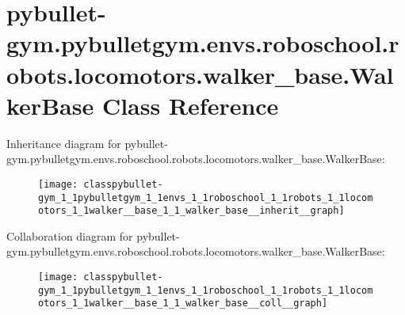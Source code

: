 \hypertarget{classpybullet-gym_1_1pybulletgym_1_1envs_1_1roboschool_1_1robots_1_1locomotors_1_1walker__base_1_1_walker_base}{}\section{pybullet-\/gym.pybulletgym.\+envs.\+roboschool.\+robots.\+locomotors.\+walker\+\_\+base.\+Walker\+Base Class Reference}
\label{classpybullet-gym_1_1pybulletgym_1_1envs_1_1roboschool_1_1robots_1_1locomotors_1_1walker__base_1_1_walker_base}


Inheritance diagram for pybullet-\/gym.pybulletgym.\+envs.\+roboschool.\+robots.\+locomotors.\+walker\+\_\+base.\+Walker\+Base\+:
\nopagebreak
\begin{figure}[H]
\begin{center}
\leavevmode
\texttt{[image: classpybullet-gym\_1\_1pybulletgym\_1\_1envs\_1\_1roboschool\_1\_1robots\_1\_1locomotors\_1\_1walker\_\_base\_1\_1\_walker\_base\_\_inherit\_\_graph]}
\end{center}
\end{figure}


Collaboration diagram for pybullet-\/gym.pybulletgym.\+envs.\+roboschool.\+robots.\+locomotors.\+walker\+\_\+base.\+Walker\+Base\+:
\nopagebreak
\begin{figure}[H]
\begin{center}
\leavevmode
\texttt{[image: classpybullet-gym\_1\_1pybulletgym\_1\_1envs\_1\_1roboschool\_1\_1robots\_1\_1locomotors\_1\_1walker\_\_base\_1\_1\_walker\_base\_\_coll\_\_graph]}
\end{center}
\end{figure}
